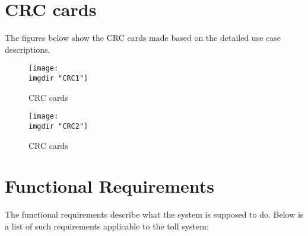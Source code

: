 \section{CRC cards}
The figures below show the CRC cards made based on the detailed use case descriptions.

\begin{figure}[H]
\texttt{[image: \\imgdir "CRC1"]}
\centering
\caption{CRC cards}
\label{fig:crc_1}
\end{figure}

\begin{figure}[H]
\texttt{[image: \\imgdir "CRC2"]}
\centering
\caption{CRC cards}
\label{fig:crc_2}
\end{figure}

\section{Functional Requirements}
\label{sec:requirements}
The functional requirements describe what the system is supposed to do. Below is a list of such requirements applicable to the toll system:
